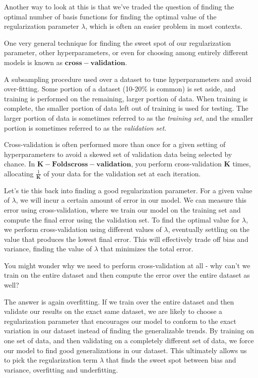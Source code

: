 Another way to look at this is that we've traded the question of finding the optimal number of basis functions for finding the optimal value of the regularization parameter $\lambda$, which is often an easier problem in most contexts.

One very general technique for finding the sweet spot of our regularization parameter, other hyperparameters, or even for choosing among entirely different models is known as $\mathbf{cross-validation}$.

\begin{definition}
    A subsampling procedure used over a dataset to tune hyperparameters and avoid over-fitting. Some portion of a dataset (10-20\% is common) is set aside, and training is performed on the remaining, larger portion of data. When training is complete, the smaller portion of data left out of training is used for testing. The larger portion of data is sometimes referred to as the \textit{training set}, and the smaller portion is sometimes referred to as the \textit{validation set}.
\end{definition}

Cross-validation is often performed more than once for a given setting of hyperparameters to avoid a skewed set of validation data being selected by chance. In $\mathbf{K-Folds cross-validation}$, you perform cross-validation $\mathbf{K}$ times, allocating $\frac{1}{\mathbf{K}}$ of your data for the validation set at each iteration.

Let's tie this back into finding a good regularization parameter. For a given value of $\lambda$, we will incur a certain amount of error in our model. We can measure this error using cross-validation, where we train our model on the training set and compute the final error using the validation set. To find the optimal value for $\lambda$, we perform cross-validation using different values of $\lambda$, eventually settling on the value that produces the lowest final error. This will effectively trade off bias and variance, finding the value of $\lambda$ that minimizes the total error.

You might wonder why we need to perform cross-validation at all - why can't we train on the entire dataset and then compute the error over the entire dataset as well?

The answer is again overfitting. If we train over the entire dataset and then validate our results on the exact same dataset, we are likely to choose a regularization parameter that encourages our model to conform to the exact variation in our dataset instead of finding the generalizable trends. By training on one set of data, and then validating on a completely different set of data, we force our model to find good generalizations in our dataset. This ultimately allows us to pick the regularization term $\lambda$ that finds the sweet spot between bias and variance, overfitting and underfitting.

